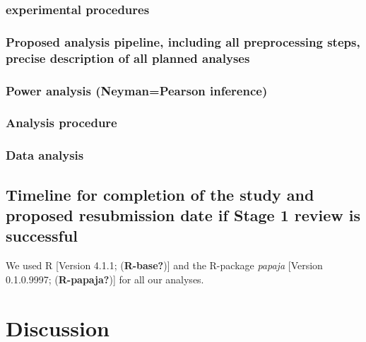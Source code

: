 \documentclass[
  english,
  man]{apa6}
\begin{document}
\hypertarget{experimental-procedures-1}{%
\subsubsection{experimental procedures}\label{experimental-procedures-1}}

\hypertarget{proposed-analysis-pipeline-including-all-preprocessing-steps-precise-description-of-all-planned-analyses-1}{%
\subsubsection{Proposed analysis pipeline, including all preprocessing steps, precise description of all planned analyses}\label{proposed-analysis-pipeline-including-all-preprocessing-steps-precise-description-of-all-planned-analyses-1}}

\hypertarget{power-analysis-neymanpearson-inference-1}{%
\subsubsection{Power analysis (Neyman=Pearson inference)}\label{power-analysis-neymanpearson-inference-1}}

\hypertarget{analysis-procedure-1}{%
\subsubsection{Analysis procedure}\label{analysis-procedure-1}}

\hypertarget{data-analysis-1}{%
\subsubsection{Data analysis}\label{data-analysis-1}}

\hypertarget{timeline-for-completion-of-the-study-and-proposed-resubmission-date-if-stage-1-review-is-successful}{%
\subsection{Timeline for completion of the study and proposed resubmission date if Stage 1 review is successful}\label{timeline-for-completion-of-the-study-and-proposed-resubmission-date-if-stage-1-review-is-successful}}

We used R {[}Version 4.1.1; (\textbf{R-base?}){]} and the R-package \emph{papaja} {[}Version 0.1.0.9997; (\textbf{R-papaja?}){]} for all our analyses.

\hypertarget{discussion}{%
\section{Discussion}\label{discussion}}
\end{document}
